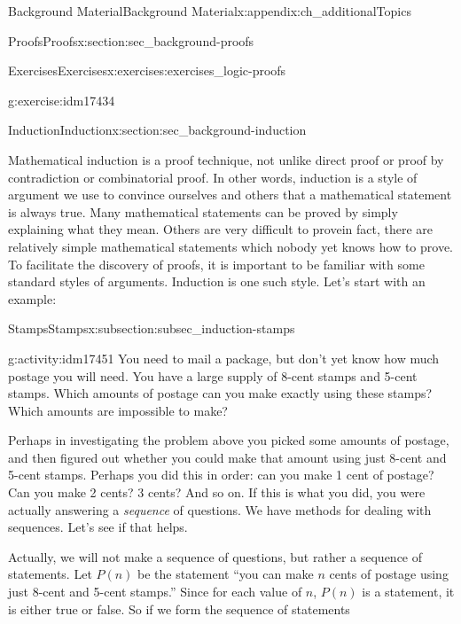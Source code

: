\documentclass[oneside,10pt,]{book}
\numberwithin{equation}{chapter}
\begin{document}
\begin{appendixptx}{Background Material}{}{Background Material}{}{}{x:appendix:ch_additionalTopics}
\begin{sectionptx}{Proofs}{}{Proofs}{}{}{x:section:sec_background-proofs}
\begin{exercises-subsection}{Exercises}{}{Exercises}{}{}{x:exercises:exercises_logic-proofs}
\begin{divisionexercise}{20}{}{}{g:exercise:idm17434}
\begin{sidebyside}{1}{0.4}{0.4}{0}
\end{sidebyside}%
\end{divisionexercise}%
\end{exercises-subsection}
\end{sectionptx}
%
%
\typeout{************************************************}
\typeout{************************************************}
%
\begin{sectionptx}{Induction}{}{Induction}{}{}{x:section:sec_background-induction}
\begin{introduction}{}%
 Mathematical induction is a proof technique, not unlike direct proof or proof by contradiction or combinatorial proof. In other words, induction is a style of argument we use to convince ourselves and others that a mathematical statement is always true. Many mathematical statements can be proved by simply explaining what they mean. Others are very difficult to prove\textemdash{}in fact, there are relatively simple mathematical statements which nobody yet knows how to prove. To facilitate the discovery of proofs, it is important to be familiar with some standard styles of arguments. Induction is one such style. Let's start with an example:%
\end{introduction}%
%
%
\typeout{************************************************}
\typeout{************************************************}
%
\begin{subsectionptx}{Stamps}{}{Stamps}{}{}{x:subsection:subsec_induction-stamps}
\begin{activity}{}{g:activity:idm17451}%
You need to mail a package, but don't yet know how much postage you will need. You have a large supply of 8-cent stamps and 5-cent stamps. Which amounts of postage can you make exactly using these stamps? Which amounts are impossible to make?%
\end{activity}
Perhaps in investigating the problem above you picked some amounts of postage, and then figured out whether you could make that amount using just 8-cent and 5-cent stamps. Perhaps you did this in order: can you make 1 cent of postage? Can you make 2 cents? 3 cents? And so on. If this is what you did, you were actually answering a \emph{sequence} of questions. We have methods for dealing with sequences. Let's see if that helps.%
\par
Actually, we will not make a sequence of questions, but rather a sequence of statements. Let \(P(n)\)\label{g:notation:idm17457} be the statement ``you can make \(n\) cents of postage using just 8-cent and 5-cent stamps.'' Since for each value of \(n\), \(P(n)\) is a statement, it is either true or false. So if we form the sequence of statements%

\end{subsectionptx}
\end{sectionptx}
\end{appendixptx}
\end{document}
